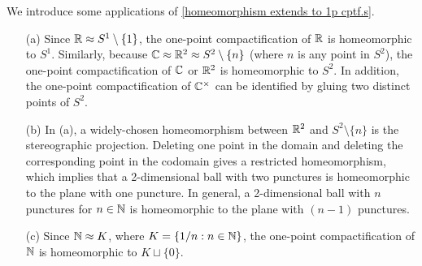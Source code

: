 \begin{exmp}
    We introduce some applications of \cref{homeomorphism extends to 1p cptf.s}.
    \begin{enumerate}
        \item[(a)]
        {
            Since ${\mathbb{R}}\approx S^1\setminus\{1\}$, the one-point compactification of ${\mathbb{R}}$ is homeomorphic to $S^1$.
            Similarly, because ${\mathbb{C}}\approx{\mathbb{R}}^2\approx S^2\setminus\{n\}$ (where $n$ is any point in $S^2$), the one-point compactification of ${\mathbb{C}}$ or ${\mathbb{R}}^2$ is homeomorphic to $S^2$.
            In addition, the one-point compactification of ${\mathbb{C}}^\times$ can be identified by gluing two distinct points of $S^2$.
        }
        \item[(b)]
        {
            In (a), a widely-chosen homeomorphism between ${\mathbb{R}}^2$ and $S^2\setminus\{n\}$ is the stereographic projection.
            Deleting one point in the domain and deleting the corresponding point in the codomain gives a restricted homeomorphism, which implies that a 2-dimensional ball with two punctures is homeomorphic to the plane with one puncture.
            In general, a 2-dimensional ball with $n$ punctures for $n\in{\mathbb{N}}$ is homeomorphic to the plane with $(n-1)$ punctures.
        }
        \item[(c)]
        {
            Since ${\mathbb{N}}\approx K$, where $K=\left\{1/n: n\in{\mathbb{N}}\right\}$, the one-point compactification of ${\mathbb{N}}$ is homeomorphic to $K\sqcup\{0\}$.
        }
    \end{enumerate}
\end{exmp}